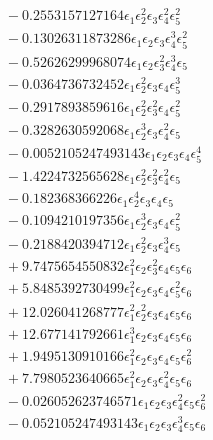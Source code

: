 \documentclass[10pt]{article}
\begin{document}
\begin{align*}
&{}  - 0.2553157127164 \epsilon_{1} \epsilon_{2}^{2} \epsilon_{3} \epsilon_{4}^{2} \epsilon_{5}^{2} \\
&{}  - 0.13026311873286 \epsilon_{1} \epsilon_{2} \epsilon_{3} \epsilon_{4}^{3} \epsilon_{5}^{2} \\
&{}  - 0.52626299968074 \epsilon_{1} \epsilon_{2} \epsilon_{3}^{2} \epsilon_{4}^{3} \epsilon_{5} \\
&{}  - 0.0364736732452 \epsilon_{1} \epsilon_{2}^{2} \epsilon_{3} \epsilon_{4} \epsilon_{5}^{3} \\
&{}  - 0.2917893859616 \epsilon_{1} \epsilon_{2}^{2} \epsilon_{3}^{2} \epsilon_{4} \epsilon_{5}^{2} \\
&{}  - 0.3282630592068 \epsilon_{1} \epsilon_{2}^{3} \epsilon_{3} \epsilon_{4}^{2} \epsilon_{5} \\
&{}  - 0.0052105247493143 \epsilon_{1} \epsilon_{2} \epsilon_{3} \epsilon_{4} \epsilon_{5}^{4} \\
&{}  - 1.4224732565628 \epsilon_{1} \epsilon_{2}^{2} \epsilon_{3}^{2} \epsilon_{4}^{2} \epsilon_{5} \\
&{}  - 0.182368366226 \epsilon_{1} \epsilon_{2}^{4} \epsilon_{3} \epsilon_{4} \epsilon_{5} \\
&{}  - 0.1094210197356 \epsilon_{1} \epsilon_{2}^{3} \epsilon_{3} \epsilon_{4} \epsilon_{5}^{2} \\
&{}  - 0.2188420394712 \epsilon_{1} \epsilon_{2}^{2} \epsilon_{3} \epsilon_{4}^{3} \epsilon_{5} \\
&{}  + 9.7475654550832 \epsilon_{1}^{2} \epsilon_{2} \epsilon_{3}^{2} \epsilon_{4} \epsilon_{5} \epsilon_{6} \\
&{}  + 5.8485392730499 \epsilon_{1}^{2} \epsilon_{2} \epsilon_{3} \epsilon_{4} \epsilon_{5}^{2} \epsilon_{6} \\
&{}  + 12.026041268777 \epsilon_{1}^{2} \epsilon_{2}^{2} \epsilon_{3} \epsilon_{4} \epsilon_{5} \epsilon_{6} \\
&{}  + 12.677141792661 \epsilon_{1}^{3} \epsilon_{2} \epsilon_{3} \epsilon_{4} \epsilon_{5} \epsilon_{6} \\
&{}  + 1.9495130910166 \epsilon_{1}^{2} \epsilon_{2} \epsilon_{3} \epsilon_{4} \epsilon_{5} \epsilon_{6}^{2} \\
&{}  + 7.7980523640665 \epsilon_{1}^{2} \epsilon_{2} \epsilon_{3} \epsilon_{4}^{2} \epsilon_{5} \epsilon_{6} \\
&{}  - 0.026052623746571 \epsilon_{1} \epsilon_{2} \epsilon_{3} \epsilon_{4}^{2} \epsilon_{5} \epsilon_{6}^{2} \\
&{}  - 0.052105247493143 \epsilon_{1} \epsilon_{2} \epsilon_{3} \epsilon_{4}^{3} \epsilon_{5} \epsilon_{6} \\

\end{align*}
\end{document}
